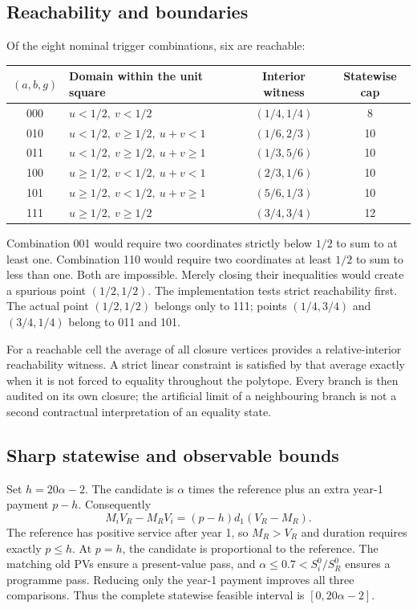 \documentclass[11pt,a4paper]{article}
\begin{document}
\subsection{Reachability and boundaries}
Of the eight nominal trigger combinations, six are reachable:
\begin{center}\small
\begin{tabular}{clcc}\toprule
$(a,b,g)$ & Domain within the unit square & Interior witness & Statewise cap\\\midrule
000 &$u<1/2,\ v<1/2$&$(1/4,1/4)$&8\\
010 &$u<1/2,\ v\geq1/2,\ u+v<1$&$(1/6,2/3)$&10\\
011 &$u<1/2,\ v\geq1/2,\ u+v\geq1$&$(1/3,5/6)$&10\\
100 &$u\geq1/2,\ v<1/2,\ u+v<1$&$(2/3,1/6)$&10\\
101 &$u\geq1/2,\ v<1/2,\ u+v\geq1$&$(5/6,1/3)$&10\\
111 &$u\geq1/2,\ v\geq1/2$&$(3/4,3/4)$&12\\\bottomrule
\end{tabular}\normalsize
\end{center}
Combination 001 would require two coordinates strictly below $1/2$ to sum to at least one. Combination 110 would require two coordinates at least $1/2$ to sum to less than one. Both are impossible. Merely closing their inequalities would create a spurious point $(1/2,1/2)$. The implementation tests strict reachability first. The actual point $(1/2,1/2)$ belongs only to 111; points $(1/4,3/4)$ and $(3/4,1/4)$ belong to 011 and 101.

For a reachable cell the average of all closure vertices provides a relative-interior reachability witness. A strict linear constraint is satisfied by that average exactly when it is not forced to equality throughout the polytope. Every branch is then audited on its own closure; the artificial limit of a neighbouring branch is not a second contractual interpretation of an equality state.

\subsection{Sharp statewise and observable bounds}
Set $h=20\alpha-2$. The candidate is $\alpha$ times the reference plus an extra year-1 payment $p-h$. Consequently
\[
M_iV_R-M_RV_i=(p-h)d_1(V_R-M_R).
\]
The reference has positive service after year 1, so $M_R>V_R$ and duration requires exactly $p\leq h$. At $p=h$, the candidate is proportional to the reference. The matching old PVs ensure a present-value pass, and $\alpha\leq0.7<S_i^0/S_R^0$ ensures a programme pass. Reducing only the year-1 payment improves all three comparisons. Thus the complete statewise feasible interval is $[0,20\alpha-2]$.
\end{document}
